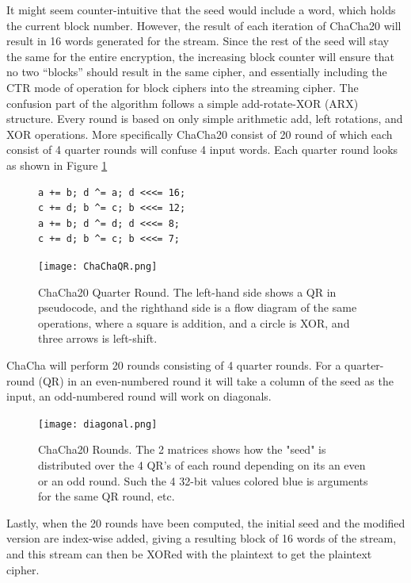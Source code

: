 \documentclass[a4paper, openany]{book}
\begin{document}
It might seem counter-intuitive that the seed would include a word, which holds the current block number. However, the result of each iteration of ChaCha20 will result in 16 words generated for the stream. Since the rest of the seed will stay the same for the entire encryption, the increasing block counter will ensure that no two ``blocks'' should result in the same cipher, and essentially including the CTR mode of operation for block ciphers into the streaming cipher. The confusion part of the algorithm follows a simple add-rotate-XOR (ARX) structure. Every round is based on only simple arithmetic add, left rotations, and XOR operations. More specifically ChaCha20 consist of 20 round of which each consist of 4 quarter rounds will confuse 4 input words. Each quarter round looks as shown in Figure \ref{fig:ChaChaQR}
\begin{figure}[H]
\begin{minipage}{0.4\textwidth}
\begin{verbatim}
a += b; d ^= a; d <<<= 16;
c += d; b ^= c; b <<<= 12;
a += b; d ^= d; d <<<= 8;
c += d; b ^= c; b <<<= 7;
\end{verbatim}
\end{minipage}
\qquad
\begin{minipage}{0.4\textwidth}
\texttt{[image: ChaChaQR.png]}
\end{minipage}
\captionsetup{width=.8\linewidth}
\caption[ChaCha20 Quarter Round]%
{ChaCha20 Quarter Round. The left-hand side shows a QR in pseudocode, and the righthand side is a flow diagram of the same operations, where a square is addition, and a circle is XOR, and three arrows is left-shift.}
\label{fig:ChaChaQR}
\end{figure}
ChaCha will perform 20 rounds consisting of 4 quarter rounds. For a quarter-round (QR) in an even-numbered round it will take a column of the seed as the input, an odd-numbered round will work on diagonals.
\begin{figure}[H]
\centering
\captionsetup{width=.8\linewidth}
\texttt{[image: diagonal.png]}
\caption[ChaCha20 Rounds]
{ChaCha20 Rounds. The 2 matrices shows how the "seed" is distributed over the 4 QR's of each round depending on its an even or an odd round. Such the 4 32-bit values colored blue is arguments for the same QR round, etc.}
\label{fig:ChaChaRound}
\end{figure}

Lastly, when the 20 rounds have been computed, the initial seed and the modified version are index-wise added, giving a resulting block of 16 words of the stream, and this stream can then be XORed with the plaintext to get the plaintext cipher.
\end{document}
